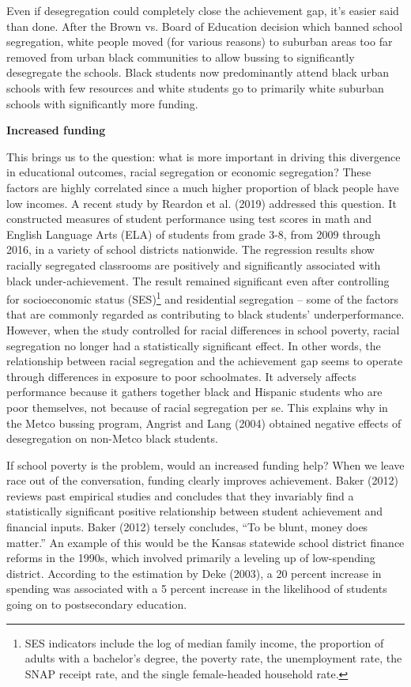 \noindent Even if desegregation could completely close the achievement gap, it’s easier said than done. After the Brown vs. Board of Education decision which banned school segregation, white people moved (for various reasons) to suburban areas too far removed from urban black communities to allow bussing to significantly desegregate the schools. Black students now predominantly attend black urban schools with few resources and white students go to primarily white suburban schools with significantly more funding. 

\noindent\textbf{Increased funding}

\noindent This brings us to the question: what is more important in driving this divergence in educational outcomes, racial segregation or economic segregation? These factors are highly correlated since a much higher proportion of black people have low incomes. A recent study by Reardon et al. (2019) addressed this question. It constructed measures of student performance using test scores in math and English Language Arts (ELA) of students from grade 3-8, from 2009 through 2016, in a variety of school districts nationwide. The regression results show racially segregated classrooms are positively and significantly associated with black under-achievement. The result remained significant even after controlling for socioeconomic status (SES)\footnote{SES indicators include the log of median family income, the proportion of adults with a bachelor’s degree, the poverty rate, the unemployment rate, the SNAP receipt rate, and the single female-headed household rate.} and residential segregation – some of the factors that are commonly regarded as contributing to black students’ underperformance.  However, when the study controlled for racial differences in school poverty, racial segregation no longer had a statistically significant effect. In other words, the relationship between racial segregation and the achievement gap seems to operate through differences in exposure to poor schoolmates. It adversely affects performance because it gathers together black and Hispanic students who are poor themselves, not because of racial segregation per se. This explains why in the Metco bussing program, Angrist and Lang (2004) obtained negative effects of desegregation on non-Metco black students. 

\noindent If school poverty is the problem, would an increased funding help? When we leave race out of the conversation, funding clearly improves achievement. Baker (2012) reviews past empirical studies and concludes that they invariably find a statistically significant positive relationship between student achievement and financial inputs. Baker (2012) tersely concludes, “To be blunt, money does matter.” An example of this would be the Kansas statewide school district finance reforms in the 1990s, which involved primarily a leveling up of low-spending district. According to the estimation by Deke (2003), a 20 percent increase in spending was associated with a 5 percent increase in the likelihood of students going on to postsecondary education.

